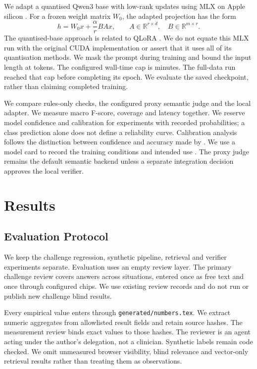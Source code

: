 \documentclass[10pt]{article}
\begin{document}
We adapt a quantised Qwen3 base \citep{qwen} with low-rank updates \citep{lora} using
MLX on Apple silicon \citep{mlx}. For a frozen weight matrix $W_0$, the adapted
projection has the form
\begin{equation}
 h=W_0x+\frac{\alpha}{r}BAx,
 \qquad A\in\mathbb R^{r\times d},\quad B\in\mathbb R^{m\times r}.
\end{equation}
The quantised-base approach is related to QLoRA \citep{qlora}. We do not equate this
MLX run with the original CUDA implementation or assert that it uses all of its
quantisation methods. We mask the prompt during training and bound the input length
at \SequenceLimit{} tokens. The configured wall-time cap is \TrainingMinuteCap{}
minutes. The full-data run reached that cap before completing its epoch. We evaluate
the saved checkpoint, rather than claiming completed training.

We compare rules-only checks, the configured proxy semantic judge and the local
adapter. We measure macro F-score, coverage and latency together. We reserve model
confidence and calibration for experiments with recorded probabilities; a class
prediction alone does not define a reliability curve. Calibration analysis follows
the distinction between confidence and accuracy made by \citet{guo}. We use a model
card to record the training conditions and intended use \citep{modelcards}.
The proxy judge remains the default semantic backend unless a separate integration
decision approves the local verifier.

\FloatBarrier
\section{Results}
\subsection{Evaluation Protocol}
We keep the challenge regression, synthetic pipeline, retrieval and verifier
experiments separate. Evaluation uses an empty review layer. The primary challenge
review covers \RegressionTarget{} answers across \SituationCount{} situations,
entered once as free text and once through configured chips. We use existing review
records and do not run or publish new challenge blind results.

Every empirical value enters through \texttt{generated/numbers.tex}. We extract
numeric aggregates from allowlisted result fields and retain source hashes. The
measurement review binds exact values to those hashes. The reviewer is an agent
acting under the author's delegation, not a clinician. Synthetic labels remain
code checked. We omit unmeasured browser visibility, blind relevance and vector-only
retrieval results rather than treating them as observations.
\end{document}
